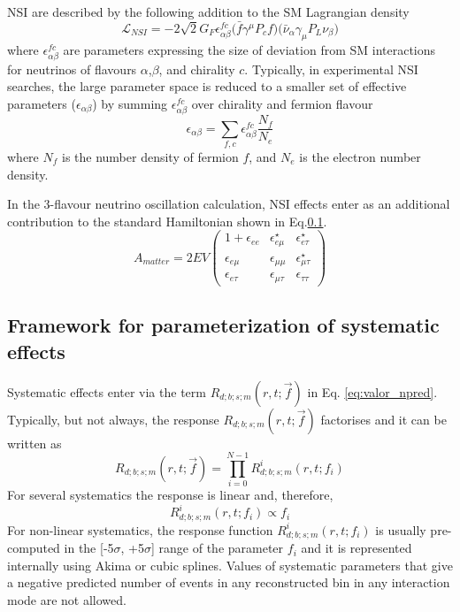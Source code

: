 NSI are described by the following addition to the SM Lagrangian density
\begin{equation}
  \mathcal{L}_{NSI} = -2 \sqrt{2} G_{F} 
    \epsilon_{\alpha \beta}^{fc}
    \Big( \bar{f} \gamma^{\mu} P_{c} f \Big)
    \Big( \bar{\nu}_{\alpha} \gamma_{\mu} P_{L} \nu_{\beta} \Big)
\label{eq:nsi_lagrangian_density}
\end{equation}
where $\epsilon_{\alpha \beta}^{fc}$ are parameters expressing the size
of deviation from SM interactions for neutrinos of flavours $\alpha$,$\beta$,
and chirality $c$. Typically, in experimental NSI searches, the large parameter space
is reduced to a smaller set of effective parameters ($\epsilon_{\alpha \beta}$) by
summing $\epsilon_{\alpha \beta}^{fc}$ over chirality and fermion flavour
\begin{equation}
\epsilon_{\alpha \beta} = \sum_{f,c} \epsilon_{\alpha \beta}^{fc} \frac{N_f}{N_e}
\label{eq:nsi_epsilon_ab}
\end{equation}
where $N_f$ is the number density of fermion $f$, and
$N_e$ is the electron number density.

In the 3-flavour neutrino oscillation calculation, 
NSI effects enter as an additional contribution to the standard Hamiltonian shown in Eq.\ref{}. 
\begin{equation}
A_{matter} = 2EV \left(
\begin{array}{ccc}
1+\epsilon_{ee}  & \epsilon_{e\mu}^{\star} & \epsilon_{e\tau}^{\star} \\
\epsilon_{e\mu}  & \epsilon_{\mu\mu}       & \epsilon_{\mu\tau}^{\star} \\
\epsilon_{e\tau} & \epsilon_{\mu\tau}      & \epsilon_{\tau\tau}
\end{array} \right)
\end{equation}


\subsection{Framework for parameterization of systematic effects}

Systematic effects enter via the term $R_{d;b;s;m}(r,t; \vec{f})$ in Eq. \ref{eq:valor_npred}.
Typically, but not always, the response $R_{d;b;s;m}(r,t; \vec{f})$ 
factorises and it can be written as 
\begin{equation}
  R_{d;b;s;m}(r,t; \vec{f}) = \prod_{i=0}^{N-1} R^{i}_{d;b;s;m}(r,t; f_i)
\label{eq:valor_response_factorization}
\end{equation}
For several systematics the response is linear and, therefore, 
\begin{equation}
  R^{i}_{d;b;s;m}(r,t; f_i) \propto f_i
\label{eq:valor_linear_response}
\end{equation}
For non-linear systematics, the response function $R^{i}_{d;b;s;m}(r,t; f_i)$ 
is usually pre-computed in the [-5$\sigma$, +5$\sigma$] range of the parameter $f_i$ 
and it is represented internally using Akima or cubic splines.
Values of systematic parameters that give a negative predicted number of events 
in any reconstructed bin in any interaction mode are not allowed.


